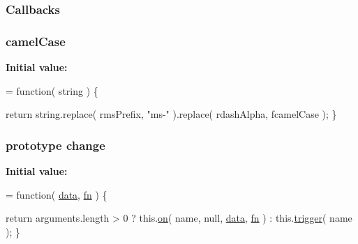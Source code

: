 \subsubsection[{Callbacks}]{ Callbacks}\label{jquery-1_810_82-vsdoc_8js_add8d59d25831bb9b171fdbee8a18795b}
\hypertarget{jquery-1_810_82-vsdoc_8js_a4925571918a5ff725c5e5fb8a6ab19a4}{}
\subsubsection[{camel\+Case}]{ camel\+Case}\label{jquery-1_810_82-vsdoc_8js_a4925571918a5ff725c5e5fb8a6ab19a4}
{\bfseries Initial value\+:}
\begin{DoxyCode}
= \textcolor{keyword}{function}( string ) \{

        \textcolor{keywordflow}{return} \textcolor{keywordtype}{string}.replace( rmsPrefix, \textcolor{stringliteral}{"ms-"} ).replace( rdashAlpha, fcamelCase );
    \}
\end{DoxyCode}
\hypertarget{jquery-1_810_82-vsdoc_8js_a457ba1597967ed9e42e50a10a750290b}{}
\subsubsection[{change}]{ {\bf prototype} change}\label{jquery-1_810_82-vsdoc_8js_a457ba1597967ed9e42e50a10a750290b}
{\bfseries Initial value\+:}
\begin{DoxyCode}
= \textcolor{keyword}{function}( \hyperlink{jquery-1_810_82-vsdoc_8js_a609407b3456fdc3c5671a9fc4a226ff7}{data}, \hyperlink{jquery-1_810_82-vsdoc_8js_acef6bdaf6b9b20fdcca1ea86f0902c3b}{fn} ) \{


        \textcolor{keywordflow}{return} arguments.length > 0 ?
            this.\hyperlink{jquery-1_810_82-vsdoc_8js_ae453b412b883f60220d73468ef6c6dbc}{on}( name, null, \hyperlink{jquery-1_810_82-vsdoc_8js_a609407b3456fdc3c5671a9fc4a226ff7}{data}, \hyperlink{jquery-1_810_82-vsdoc_8js_acef6bdaf6b9b20fdcca1ea86f0902c3b}{fn} ) :
            this.\hyperlink{jquery-1_810_82-vsdoc_8js_a2388c4114d5e3e4eab020f973641519c}{trigger}( name );
    \}
\end{DoxyCode}
\hypertarget{jquery-1_810_82-vsdoc_8js_a8f481f41dc3f2af7fcadd06c7fba0815}{}
